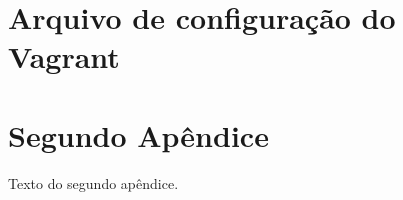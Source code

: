 \begin{apendicesenv}

\partapendices

\chapter{Arquivo de configuração do Vagrant}
\label{apendice:vagrantFile}


\chapter{Segundo Apêndice}

Texto do segundo apêndice.

\end{apendicesenv}
